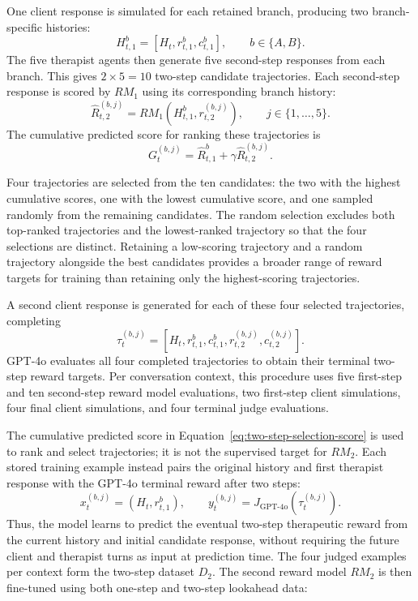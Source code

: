 One client response is simulated for each retained branch, producing two branch-specific histories:
\begin{equation}
H_{t,1}^{b}=[H_t,r_{t,1}^{b},c_{t,1}^{b}],
\qquad b\in\{A,B\}.
\end{equation}
The five therapist agents then generate five second-step responses from each branch. This gives \(2\times5=10\) two-step candidate trajectories. Each second-step response is scored by \(RM_1\) using its corresponding branch history:
\begin{equation}
\hat{R}_{t,2}^{(b,j)}=RM_1(H_{t,1}^{b},r_{t,2}^{(b,j)}),
\qquad j\in\{1,\ldots,5\}.
\end{equation}
The cumulative predicted score for ranking these trajectories is
\begin{equation}
G_t^{(b,j)}=\hat{R}_{t,1}^{b}+\gamma\hat{R}_{t,2}^{(b,j)}.
\label{eq:two-step-selection-score}
\end{equation}

Four trajectories are selected from the ten candidates: the two with the highest cumulative scores, one with the lowest cumulative score, and one sampled randomly from the remaining candidates. The random selection excludes both top-ranked trajectories and the lowest-ranked trajectory so that the four selections are distinct. Retaining a low-scoring trajectory and a random trajectory alongside the best candidates provides a broader range of reward targets for training than retaining only the highest-scoring trajectories.

A second client response is generated for each of these four selected trajectories, completing
\begin{equation}
\tau_t^{(b,j)}=[H_t,r_{t,1}^{b},c_{t,1}^{b},r_{t,2}^{(b,j)},c_{t,2}^{(b,j)}].
\end{equation}
GPT-4o evaluates all four completed trajectories to obtain their terminal two-step reward targets. Per conversation context, this procedure uses five first-step and ten second-step reward model evaluations, two first-step client simulations, four final client simulations, and four terminal judge evaluations.

The cumulative predicted score in Equation~\ref{eq:two-step-selection-score} is used to rank and select trajectories; it is not the supervised target for \(RM_2\). Each stored training example instead pairs the original history and first therapist response with the GPT-4o terminal reward after two steps:
\begin{equation}
x_t^{(b,j)}=(H_t,r_{t,1}^{b}),
\qquad y_t^{(b,j)}=J_{\mathrm{GPT\text{-}4o}}(\tau_t^{(b,j)}).
\label{eq:two-step-training-example}
\end{equation}
Thus, the model learns to predict the eventual two-step therapeutic reward from the current history and initial candidate response, without requiring the future client and therapist turns as input at prediction time. The four judged examples per context form the two-step dataset \(D_2\). The second reward model \(RM_2\) is then fine-tuned using both one-step and two-step lookahead data:

